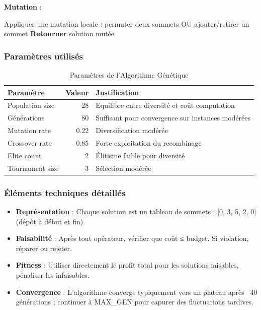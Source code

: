 \documentclass[11pt,a4paper]{article}
\begin{document}
\textbf{Mutation} :
\begin{algorithm}[H]
\caption{Mutation}
\begin{algorithmic}[1]
            \State Appliquer une mutation locale : permuter deux sommets OU ajouter/retirer un sommet
        \EndIf
    \EndFor
    \State \textbf{Retourner} solution mutée
\EndFunction
\end{algorithmic}
\end{algorithm}

\subsubsection*{Paramètres utilisés}

\begin{table}[H]
\centering
\caption{Paramètres de l'Algorithme Génétique}
\begin{tabular}{lrp{6cm}}
\toprule
\textbf{Paramètre} & \textbf{Valeur} & \textbf{Justification} \\
\midrule
Population size & 28 & Equilibre entre diversité et coût computation \\
Générations & 80 & Suffisant pour convergence sur instances modérées \\
Mutation rate & 0.22 & Diversification modérée \\
Crossover rate & 0.85 & Forte exploitation du recombinage \\
Elite count & 2 & Élitisme faible pour diversité \\
Tournament size & 3 & Sélection modérée \\
\bottomrule
\end{tabular}
\end{table}

\subsubsection*{Éléments techniques détaillés}

\begin{itemize}
    \item \textbf{Représentation} : Chaque solution est un tableau de sommets : [0, 3, 5, 2, 0] (dépôt à début et fin).
    \item \textbf{Faisabilité} : Après tout opérateur, vérifier que coût ≤ budget. Si violation, réparer ou rejeter.
    \item \textbf{Fitness} : Utiliser directement le profit total pour les solutions faisables, pénaliser les infaisables.
    \item \textbf{Convergence} : L'algorithme converge typiquement vers un plateau après ~40 générations ; continuer à MAX\_GEN pour capurer des fluctuations tardives.
\end{itemize}
\end{document}
